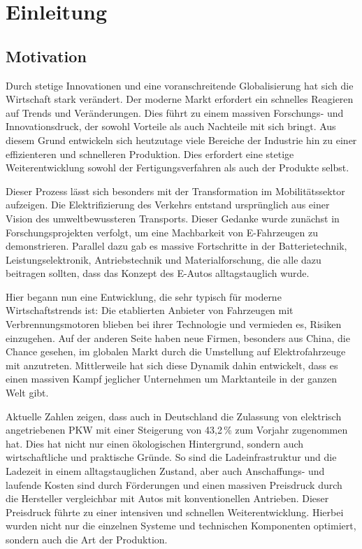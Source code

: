 \section{Einleitung}\label{sec:Einleitung}

\subsection{Motivation}\label{sec:Motivation}
Durch stetige Innovationen und eine voranschreitende Globalisierung hat sich die Wirtschaft stark
verändert. Der moderne Markt erfordert ein schnelles Reagieren auf Trends und Veränderungen.
Dies führt zu einem massiven Forschungs- und Innovationsdruck, der sowohl Vorteile als
auch Nachteile mit sich bringt.
Aus diesem Grund entwickeln sich heutzutage viele Bereiche der Industrie hin zu einer effizienteren und
schnelleren Produktion. Dies erfordert eine stetige Weiterentwicklung sowohl der
Fertigungsverfahren als auch der Produkte selbst.

Dieser Prozess lässt sich besonders mit der Transformation im Mobilitätssektor aufzeigen.
Die Elektrifizierung des Verkehrs entstand ursprünglich aus einer Vision des umweltbewussteren
Transports. Dieser Gedanke wurde zunächst in Forschungsprojekten verfolgt, um eine Machbarkeit
von E-Fahrzeugen zu demonstrieren. Parallel dazu gab es massive Fortschritte in der Batterietechnik,
Leistungselektronik, Antriebstechnik und Materialforschung, die alle dazu beitragen sollten, dass
das Konzept des E-Autos alltagstauglich wurde.

Hier begann nun eine Entwicklung, die sehr typisch für moderne Wirtschaftstrends ist: Die
etablierten Anbieter von Fahrzeugen mit Verbrennungsmotoren blieben bei ihrer Technologie und
vermieden es, Risiken einzugehen. Auf der anderen Seite haben neue Firmen, besonders aus China, die
Chance gesehen, im globalen Markt durch die Umstellung auf Elektrofahrzeuge mit anzutreten. Mittlerweile hat sich diese Dynamik dahin entwickelt,
dass es einen massiven Kampf jeglicher Unternehmen um Marktanteile in der ganzen Welt gibt.

Aktuelle Zahlen zeigen, dass auch in Deutschland die Zulassung von elektrisch angetriebenen PKW
mit einer Steigerung von 43,2\,\% zum Vorjahr zugenommen hat. Dies hat nicht nur einen ökologischen Hintergrund, sondern auch wirtschaftliche und praktische
Gründe. So sind die Ladeinfrastruktur und die Ladezeit in einem alltagstauglichen Zustand, aber
auch Anschaffungs- und laufende Kosten sind durch Förderungen und einen massiven Preisdruck durch
die Hersteller vergleichbar mit Autos mit konventionellen Antrieben. Dieser Preisdruck führte zu
einer intensiven und schnellen Weiterentwicklung. Hierbei wurden nicht nur die einzelnen Systeme und technischen Komponenten optimiert,
sondern auch die Art der Produktion.

